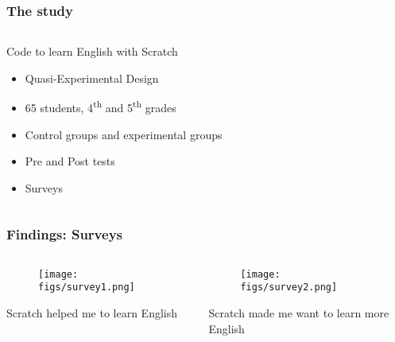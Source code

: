 \documentclass{beamer}
\begin{document}
\usebackgroundtemplate{}

\begin{frame}
\frametitle{The study}


  \begin{columns}[T]
    \begin{column}{1\textwidth}
     \begin{block}{Code to learn English with Scratch}
\begin{itemize}
  \item Quasi-Experimental Design
  \item 65 students, 4\textsuperscript{th} and 5\textsuperscript{th} grades
  \item Control groups and experimental groups
  \item Pre and Post tests
  \item Surveys
\end{itemize}
    \end{block}
    \end{column}
    
  \end{columns}

\end{frame}

\usebackgroundtemplate{}

\begin{frame}
\frametitle{Findings: Surveys}

  \begin{columns}[T]
    \begin{column}{0.5\textwidth}
    \begin{figure}[t!]
    
      \texttt{[image: figs/survey1.png]}
    
    \label{fig:repetition1}
    \end{figure}
Scratch helped me to learn English     
    \end{column}
    \begin{column}{0.5\textwidth}
    \begin{figure}[t!]
    
      \texttt{[image: figs/survey2.png]}
    
    \label{fig:repetition1}
    \end{figure} 
    Scratch made me want to learn more English
    \end{column}
  \end{columns}

\end{frame}
\end{document}
